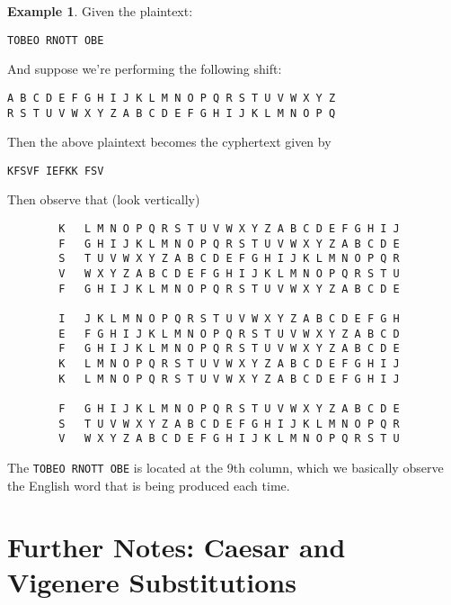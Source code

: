 \documentclass[11pt]{amsart}
\theoremstyle{definition}\newtheorem{definition}{Definition}
\theoremstyle{definition}\newtheorem{example}{Example}
\begin{document}
\begin{example}
    Given the plaintext:
    \begin{center}
        \verb|TOBEO RNOTT OBE|
    \end{center}
    And suppose we're performing the following shift:
    \begin{center}
        \verb|A B C D E F G H I J K L M N O P Q R S T U V W X Y Z| \\
        \verb|R S T U V W X Y Z A B C D E F G H I J K L M N O P Q|
    \end{center}
    Then the above plaintext becomes the cyphertext given by
    \begin{center}
        \verb|KFSVF IEFKK FSV|
    \end{center}
    Then observe that (look vertically)
    \begin{verbatim}
        K   L M N O P Q R S T U V W X Y Z A B C D E F G H I J
        F   G H I J K L M N O P Q R S T U V W X Y Z A B C D E
        S   T U V W X Y Z A B C D E F G H I J K L M N O P Q R
        V   W X Y Z A B C D E F G H I J K L M N O P Q R S T U
        F   G H I J K L M N O P Q R S T U V W X Y Z A B C D E

        I   J K L M N O P Q R S T U V W X Y Z A B C D E F G H
        E   F G H I J K L M N O P Q R S T U V W X Y Z A B C D
        F   G H I J K L M N O P Q R S T U V W X Y Z A B C D E
        K   L M N O P Q R S T U V W X Y Z A B C D E F G H I J
        K   L M N O P Q R S T U V W X Y Z A B C D E F G H I J

        F   G H I J K L M N O P Q R S T U V W X Y Z A B C D E
        S   T U V W X Y Z A B C D E F G H I J K L M N O P Q R
        V   W X Y Z A B C D E F G H I J K L M N O P Q R S T U
    \end{verbatim}
    The \verb|TOBEO RNOTT OBE| is located at the 9th column, which we basically observe the English word that is being produced each time.
\end{example}

\section{Further Notes: Caesar and Vigenere Substitutions}
\end{document}
